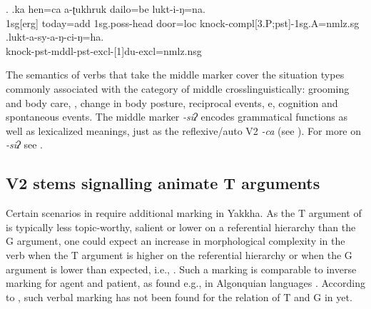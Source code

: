 \ex. \ag.ka hen=ca a-ʈukhruk dailo=be lukt-i-ŋ=na.\\
		{\sc 1sg[erg]} today{\sc =add} {\sc 1sg.poss}-head door{\sc =loc} knock{\sc -compl[3.P;pst]-1sg.A=nmlz.sg} \\
 	\bg.lukt-a-sy-a-ŋ-ci-ŋ=ha.\\
	knock-{\sc pst-mddl-pst-excl-[1]du-excl=nmlz.nsg}	\\


The semantics of verbs that take the middle marker cover the situation types commonly associated with the category of middle crosslinguistically: grooming and body care, , change in body posture, reciprocal events, e, cognition and spontaneous events. The middle marker \emph{-siʔ} encodes grammatical functions as well as lexicalized meanings, just as the reflexive/auto V2 \emph{-ca} (see ). For more on  \emph{-siʔ} see .


\subsection{V2 stems signalling animate T arguments}\label{t-sap}

Certain scenarios in  require additional marking in Yakkha. As the T argument of  is typically less topic-worthy, salient or lower on a referential hierarchy than the G argument, one could expect an increase in morphological complexity in the verb when the T argument is higher on the referential hierarchy or when the G argument is lower than expected, i.e.,  \citep[128]{Comrie1989Language}. Such a marking is comparable to inverse marking for agent and patient, as found e.g., in Algonquian languages \citep{Zuniga2007_From}. According to \citet[90]{Haspelmath2007Ditransitive}, such verbal marking has not been found  for the relation of T and G in  yet. 


